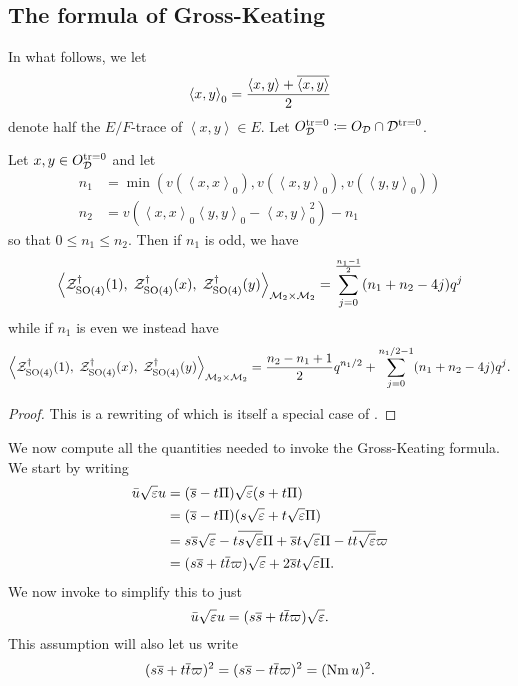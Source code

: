 \subsection{The formula of Gross-Keating}
\label{sec:GK}
In what follows, we let
\[ \left\langle x, y \right\rangle _0
  = \frac{\left\langle x,y \right\rangle + \overline{\left\langle x,y \right\rangle}}{2} \]
denote half the $E/F$-trace of $\left\langle x,y \right\rangle \in E$.
Let $O_\mathcal D^{\operatorname{tr} = 0} \coloneqq O_\mathcal D \cap \mathcal D^{\operatorname{tr} = 0}$.

\begin{proposition}
  \label{prop:GK}
  Let $x,y \in O_\mathcal D^{\operatorname{tr} = 0}$ and let
  \begin{align*}
    n_1 &= \min\left( v(\left\langle x,x \right\rangle _0), v(\left\langle x,y \right\rangle _0), v(\left\langle y,y \right\rangle _0) \right) \\
    n_2 &= v\left( \left\langle x,x \right\rangle _0 \left\langle y,y \right\rangle _0 - \left\langle x,y \right\rangle^2_0 \right) - n_1
  \end{align*}
  so that $0 \le n_1 \le n_2$.
  Then if $n_1$ is odd, we have
  \[
    \left< \mathcal Z^{\dagger}_{\operatorname{SO}(4)}(1), \; \mathcal Z^{\dagger}_{\operatorname{SO}(4)}(x), \; \mathcal Z^{\dagger}_{\operatorname{SO}(4)}(y) \right>_{\mathcal M_2 \times \mathcal M_2}
    = \sum_{j=0}^{\frac{n_1-1}{2}} (n_1+n_2-4j) q^j
  \]
  while if $n_1$ is even we instead have
  \[
    \left< \mathcal Z^{\dagger}_{\operatorname{SO}(4)}(1), \; \mathcal Z^{\dagger}_{\operatorname{SO}(4)}(x), \; \mathcal Z^{\dagger}_{\operatorname{SO}(4)}(y) \right>_{\mathcal M_2 \times \mathcal M_2}
    = \frac{n_2-n_1+1}{2} q^{n_1/2} + \sum_{j=0}^{n_1/2-1} (n_1+n_2-4j) q^j.
  \]
\end{proposition}
\begin{proof}
  This is a rewriting of \cite[Proposition 14.6]{ref:Kudla1997}
  which is itself a special case of \cite[Proposition 5.4]{ref:GK}.
\end{proof}

We now compute all the quantities needed to invoke the Gross-Keating formula.
We start by writing
\begin{align*}
  \bar u \sqrt{\varepsilon} u
  &= (\overline s - t \Pi) \sqrt{\varepsilon} (s + t \Pi) \\
  &= (\overline s - t \Pi) (s \sqrt{\varepsilon} + t \sqrt{\varepsilon} \Pi) \\
  &= s \overline s \sqrt{\varepsilon} - t \overline{s\sqrt{\varepsilon}} \Pi + \overline s t \sqrt{\varepsilon} \Pi - t \overline{t \sqrt{\varepsilon}} \varpi \\
  &= (s \overline s + t \overline t \varpi) \sqrt{\varepsilon} + 2 \overline s t \sqrt{\varepsilon} \Pi.
\end{align*}
We now invoke  to simplify this to just
\[ \bar u \sqrt{\varepsilon} u = (s \overline s + t \overline t \varpi) \sqrt{\varepsilon}. \]
This assumption will also let us write
\[ (s \overline s + t \overline t \varpi)^2 = (s \overline s - t \overline t \varpi)^2 = (\operatorname{Nm} u)^2. \]

